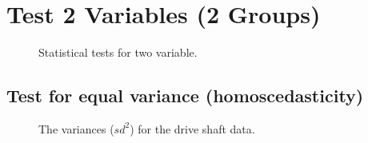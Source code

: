 \documentclass[
  a4paper,
]{scrbook}
\begin{document}
\section{Test 2 Variables (2 Groups)}\label{test-2-variables-2-groups}

\begin{figure}[H]


\caption{\label{fig-tests-TwoVar-TwoGrps}Statistical tests for two
variable.}

\end{figure}%

\subsection{Test for equal variance
(homoscedasticity)}\label{test-for-equal-variance-homoscedasticity}

\begin{figure}[ht]


\caption{\label{fig-tst-var}The variances (\(sd^2\)) for the drive shaft
data.}

\end{figure}%
\end{document}
